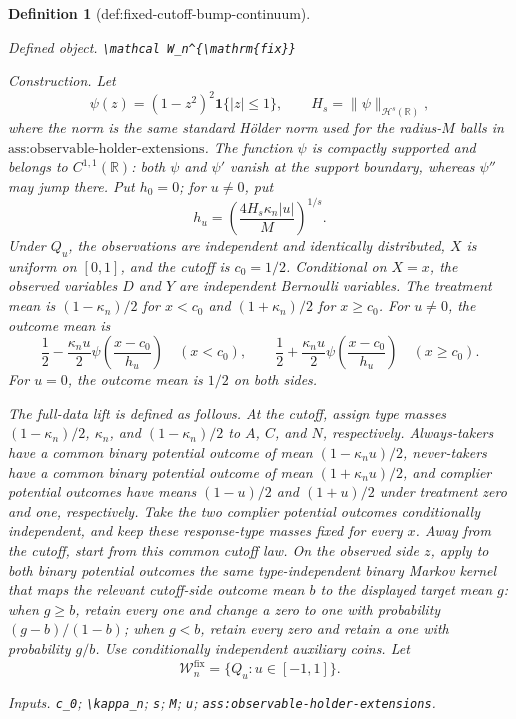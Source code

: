 \documentclass{article}
\newtheorem{definition}{Definition}
\begin{document}
\begin{definition}[def:fixed-cutoff-bump-continuum]\label{def:fixed-cutoff-bump-continuum}
\par\smallskip\noindent\emph{Defined object.} \texttt{\textbackslash{}\allowbreak{}mathcal W\_\allowbreak{}n\textasciicircum{}\{\textbackslash{}\allowbreak{}mathrm\{fix\}\allowbreak{}\}\allowbreak{}}
\par\smallskip\noindent\emph{Construction.} Let
\[
 \psi(z)=(1-z^2)^2\mathbf 1\{|z|\le1\},
 \qquad H_s=\|\psi\|_{\mathcal H^s(\mathbb R)},
\]
where the norm is the same standard H\"older norm used for the
radius-\(M\) balls in \(\text{ass:observable-holder-extensions}\).
The function \(\psi\) is compactly supported and belongs to
\(C^{1,1}(\mathbb R)\): both \(\psi\) and \(\psi'\) vanish at the
support boundary, whereas \(\psi''\) may jump there.  Put \(h_0=0\);
for \(u\ne0\), put
\[
 h_u=\left(\frac{4H_s\kappa_n|u|}{M}\right)^{1/s}.
\]
Under \(Q_u\), the observations are independent and identically
distributed, \(X\) is uniform on \([0,1]\), and the cutoff is
\(c_0=1/2\).  Conditional on \(X=x\), the observed variables \(D\) and
\(Y\) are independent Bernoulli variables.  The treatment mean is
\((1-\kappa_n)/2\) for \(x<c_0\) and \((1+\kappa_n)/2\) for
\(x\ge c_0\).  For \(u\ne0\), the outcome mean is
\[
 \frac12-\frac{\kappa_nu}{2}
 \psi\!\left(\frac{x-c_0}{h_u}\right)\quad(x<c_0),
 \qquad
 \frac12+\frac{\kappa_nu}{2}
 \psi\!\left(\frac{x-c_0}{h_u}\right)\quad(x\ge c_0).
\]
For \(u=0\), the outcome mean is \(1/2\) on both sides.

The full-data lift is defined as follows.  At the cutoff, assign type
masses \((1-\kappa_n)/2\), \(\kappa_n\), and
\((1-\kappa_n)/2\) to \(A\), \(C\), and \(N\), respectively.
Always-takers have a common binary potential outcome of mean
\((1-\kappa_nu)/2\), never-takers have a common binary potential outcome
of mean \((1+\kappa_nu)/2\), and complier potential outcomes have means
\((1-u)/2\) and \((1+u)/2\) under treatment zero and one, respectively.
Take the two complier potential outcomes conditionally independent, and
keep these response-type masses fixed for every \(x\).  Away from the
cutoff, start from this common cutoff law.  On the observed
side \(z\), apply to both binary potential outcomes the same
type-independent binary Markov kernel that maps the relevant cutoff-side
outcome mean \(b\) to the displayed target mean \(g\): when \(g\ge b\),
retain every one and change a zero to one with probability
\((g-b)/(1-b)\); when \(g<b\), retain every zero and retain a one with
probability \(g/b\).  Use conditionally independent auxiliary coins.
Let
\[
 \mathcal W_n^{\mathrm{fix}}=\{Q_u:u\in[-1,1]\}.
\]
\par\smallskip\noindent\emph{Inputs.} \texttt{c\_\allowbreak{}0}; \texttt{\textbackslash{}\allowbreak{}kappa\_\allowbreak{}n}; \texttt{s}; \texttt{M}; \texttt{u}; \texttt{ass:\allowbreak{}observable-\allowbreak{}holder-\allowbreak{}extensions}.
\end{definition}
\end{document}
